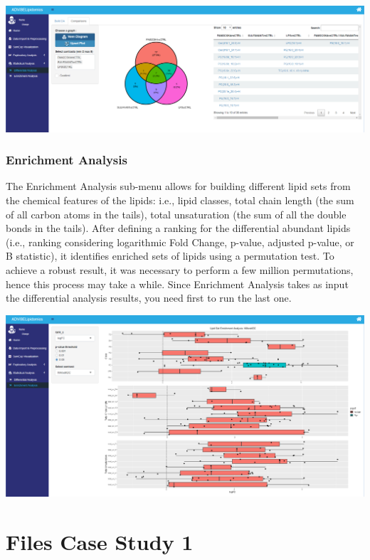 \documentclass[
]{book}
\begin{document}
\includegraphics[width=1\linewidth]{images/venn}

\hypertarget{sec352}{%
\subsection{Enrichment Analysis}\label{sec352}}

The Enrichment Analysis sub-menu allows for building different lipid sets from the chemical features of the lipids: i.e., lipid classes, total chain length (the sum of all carbon atoms in the tails), total unsaturation (the sum of all the double bonds in the tails). After defining a ranking for the differential abundant lipids (i.e., ranking considering logarithmic Fold Change, p-value, adjusted p-value, or B statistic), it identifies enriched sets of lipids using a permutation test. To achieve a robust result, it was necessary to perform a few million permutations, hence this process may take a while. Since Enrichment Analysis takes as input the differential analysis results, you need first to run the last one.

\includegraphics[width=1\linewidth]{images/enrichment}

\hypertarget{filestudy}{%
\chapter{Files Case Study 1}\label{filestudy}}
\end{document}
